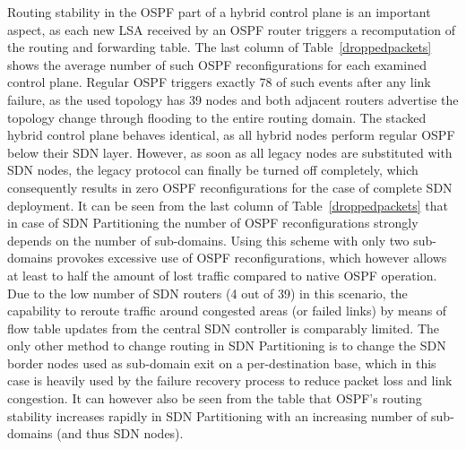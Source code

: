 \documentclass[journal]{IEEEtran}
\begin{document}
Routing stability in the OSPF part of a hybrid control plane is an important aspect, as each new LSA received by an OSPF router triggers a recomputation of the routing and forwarding table. The last column of Table~\ref{droppedpackets} shows the average number of such OSPF reconfigurations for each examined control plane. Regular OSPF triggers exactly 78 of such events after any link failure, as the used topology has 39 nodes and both adjacent routers advertise the topology change through flooding to the entire routing domain. The stacked hybrid control plane behaves identical, as all hybrid nodes perform regular OSPF below their SDN layer. However, as soon as all legacy nodes are substituted with SDN nodes, the legacy protocol can finally be turned off completely, which consequently results in zero OSPF reconfigurations for the case of complete SDN deployment. It can be seen from the last column of Table~\ref{droppedpackets} that in case of SDN Partitioning the number of OSPF reconfigurations strongly depends on the number of sub-domains. Using this scheme with only two sub-domains provokes excessive use of OSPF reconfigurations, which however allows at least to half the amount of lost traffic compared to native OSPF operation. Due to the low number of SDN routers (4 out of 39) in this scenario, the capability to reroute traffic around congested areas (or failed links) by means of flow table updates from the central SDN controller is comparably limited. The only other method to change routing in SDN Partitioning is to change the SDN border nodes used as sub-domain exit on a per-destination base, which in this case is heavily used by the failure recovery process to reduce packet loss and link congestion. It can however also be seen from the table that OSPF's routing stability increases rapidly in SDN Partitioning with an increasing number of sub-domains (and thus SDN nodes).
\end{document}
